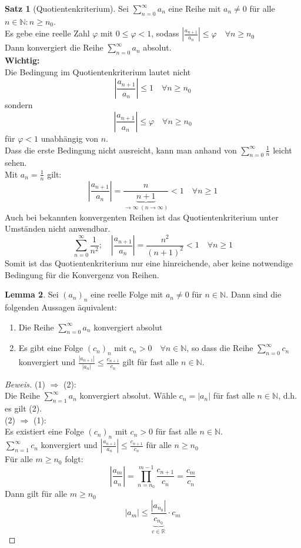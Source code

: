 \documentclass[12pt,a4paper,titlepage]{article} %
\theoremstyle{definition}
\newtheorem{satz}{Satz}[subsection]
\newtheorem{lem}[satz]{Lemma}
\theoremstyle{remark}
\newenvironment{bew}{\begin{proof}[Beweis]}{\end{proof}}
\newcommand{\N}{\mathbb{N}}
\newcommand{\R}{\mathbb{R}}
\begin{document}
	\begin{satz}[Quotientenkriterium]
		Sei \(\sum_{n=0}^{\infty} a_n\) eine Reihe mit \(a_n \neq 0\) für alle \(n \in \N: n \geq n_0\).\\
		Es gebe eine reelle Zahl \(\varphi\) mit \(0 \leq \varphi < 1\), sodass \(\left|\frac{a_{n+1}}{a_n}\right| \leq \varphi \quad \forall n \geq n_0\)\\
		Dann konvergiert die Reihe \(\sum_{n=0}^{\infty} a_n\) absolut.\\
		\textbf{Wichtig:}\\
		Die Bedingung im Quotientenkriterium lautet nicht 
		\[\left|\frac{a_{n+1}}{a_n}\right| \leq 1 \quad \forall n \geq n_0\]
		sondern
		\[\left|\frac{a_{n+1}}{a_n}\right| \leq \varphi \quad \forall n \geq n_0\]
		für \(\varphi < 1\) unabhängig von \(n\).\\
		Dass die erste Bedingung nicht ausreicht, kann man anhand von \(\sum_{n=0}^{\infty} \frac{1}{n}\) leicht sehen.\\
		Mit \(a_n = \frac{1}{n}\) gilt: 
		\[\left|\frac{a_{n+1}}{a_n}\right| = \frac{n}{\underbrace{n+1}_{\rightarrow \infty \; (n \rightarrow \infty)}} < 1 \quad \forall n \geq 1\]
		Auch bei bekannten konvergenten Reihen ist das Quotientenkriterium unter Umständen nicht anwendbar.
		\[\sum_{n=0}^{\infty} \frac{1}{n^2}; \quad \left|\frac{a_{n+1}}{a_n}\right| = \frac{n^2}{(n+1)^2} < 1 \quad \forall n \geq 1\]
		Somit ist das Quotientenkriterium nur eine hinreichende, aber keine notwendige Bedingung für die Konvergenz von Reihen.
	\end{satz}
	\begin{lem}
		Sei \((a_n)_n\) eine reelle Folge mit \(a_n \neq 0\) für \(n \in \N\). Dann sind die folgenden Aussagen äquivalent:
		\begin{enumerate}
			\item 
				Die Reihe \(\sum_{n=0}^{\infty} a_n\) konvergiert absolut
			\item
				Es gibt eine Folge \((c_n)_n\) mit \(c_n > 0 \quad \forall n \in \N\), so dass die Reihe \(\sum_{n=0}^{\infty} c_n\) konvergiert und	\(\frac{|a_{n+1}|}{|a_n|} \leq \frac{c_{n+1}}{c_n}\) gilt für fast alle \(n \in \N\).
		\end{enumerate}
	\end{lem}
	\begin{bew}
		(1) \(\Rightarrow\) (2):\\
		Die Reihe \(\sum_{n=1}^{\infty} a_n\) konvergiert absolut. Wähle \(c_n = |a_n|\) für fast alle \(n \in \N\), d.h. es gilt (2).\\
		(2) \(\Rightarrow\) (1):\\
		Es existiert eine Folge \((c_n)_n\) mit \(c_n > 0\) für fast alle \(n \in \N\).\\
		\(\sum_{n=1}^{\infty} c_n\) konvergiert und \(\left|\frac{a_{n+1}}{a_n}\right| \leq \frac{c_{n+1}}{c_n}\) für alle \(n \geq n_0\)\\
		Für alle \(m \geq n_0\) folgt:
		\[\left|\frac{a_{m}}{a_n}\right| = \prod_{n=n_0}^{m-1} \frac{c_{n+1}}{c_n} = \frac{c_{m}}{c_n}\]
		Dann gilt für alle \(m \geq n_0\)
		\[|a_m| \leq \frac{|a_{n_0}|}{\underbrace{c_{n_0}}_{c \in \R}} \cdot c_m \]
	\end{bew}
\end{document}
